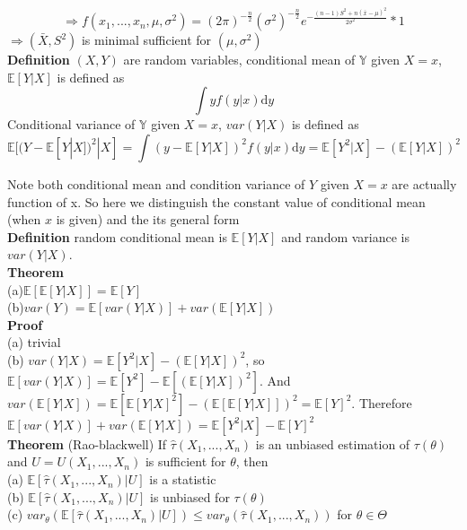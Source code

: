 \documentclass[a4paper,12pt]{article}
\begin{document}
$$\Rightarrow f(x_1, ..., x_n, \mu, \sigma^2 ) = (2\pi)^{-\frac{n}{2}}(\sigma^2)^{-\frac{n}{2}}e^{-\frac{(n-1)S^2+n(\bar{x}-\mu)^2}{2\sigma^2}} * 1$$
$\Rightarrow (\bar{X}, S^2) $ is minimal sufficient for $ (\mu, \sigma^2) $\\

\textbf{Definition} $(X, Y)$ are random variables, conditional mean of $\mathbb{Y}$ given $X=x$, $\mathbb{E}[Y|X]$ is defined as
$$\int yf(y|x) \mathrm{d}y$$
Conditional variance of $\mathbb{Y}$ given $X=x$, $var(Y|X)$ is defined as
$$\mathbb{E}[ (Y - \mathbb{E}[Y|X])^2 |X ] = \int (y-\mathbb{E}[Y|X])^2 f(y|x) \mathrm{d}y = 
\mathbb{E}[ Y^2 |X ] - (\mathbb{E}[Y|X])^2$$

Note both conditional mean and condition variance of $Y$ given $X=x$ are actually function of x. So here we distinguish the constant value of conditional mean (when $x$ is given) and the its general form\\

\textbf{Definition} random conditional mean is $\mathbb{E}[Y|X]$ and random variance is $var(Y|X)$.\\

\textbf{Theorem}\\
(a)$\mathbb{E}[\mathbb{E}[Y|X]] = \mathbb{E}[Y]$\\
(b)$var(Y) = \mathbb{E}[var(Y|X)]+var(\mathbb{E}[Y|X])$\\

\textbf{Proof}\\
(a) trivial\\
(b) $var(Y|X) = \mathbb{E}[ Y^2 |X ] - (\mathbb{E}[Y|X])^2$, so $\mathbb{E}[var(Y|X)] = \mathbb{E}[Y^2] - \mathbb{E}[(\mathbb{E}[Y|X])^2]$. And $var(\mathbb{E}[Y|X]) = \mathbb{E}[ \mathbb{E}[Y|X]^2 ] - (\mathbb{E}[\mathbb{E}[Y|X]])^2 = \mathbb{E}[Y]^2$. Therefore $\mathbb{E}[var(Y|X)]+var(\mathbb{E}[Y|X]) = \mathbb{E}[ Y^2 |X ] - \mathbb{E}[Y]^2$\\

\textbf{Theorem} (Rao-blackwell) If $\hat{\tau}(X_1, ..., X_n)$ is an unbiased estimation of $\tau(\theta)$ and $U = U(X_1, ..., X_n)$ is sufficient for $\theta$, then\\
(a) $\mathbb{E}[ \hat{\tau}(X_1, ..., X_n) | U ]$ is a statistic\\
(b) $\mathbb{E}[ \hat{\tau}(X_1, ..., X_n) | U ]$ is unbiased for $\tau(\theta)$\\
(c) $var_\theta( \mathbb{E}[ \hat{\tau}(X_1, ..., X_n) | U ] )\leq var_\theta( \hat{\tau}(X_1, ..., X_n) )$ for $\theta\in\Theta$\\
\end{document}
